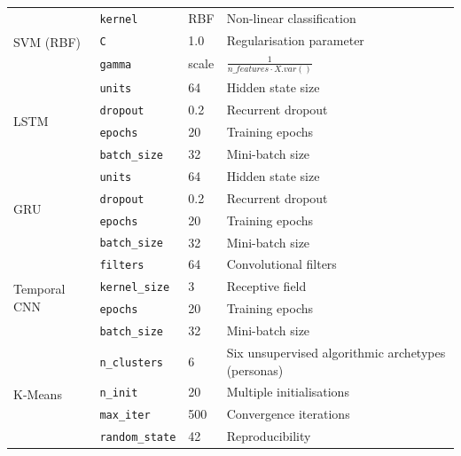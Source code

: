 \begin{table}[!t]
\begin{tabular}{llll}
    \hline
    \multirow{3}{*}{SVM (RBF)}
      & \texttt{kernel}           & RBF            & Non-linear classification \\
      & \texttt{C}                & 1.0            & Regularisation parameter \\
      & \texttt{gamma}            & scale          & $\frac{1}{n\_features \cdot X.var()}$ \\
    \hline
    \multirow{4}{*}{LSTM}
      & \texttt{units}            & 64             & Hidden state size \\
      & \texttt{dropout}          & 0.2            & Recurrent dropout \\
      & \texttt{epochs}           & 20             & Training epochs \\
      & \texttt{batch\_size}      & 32             & Mini-batch size \\
    \hline
    \multirow{4}{*}{GRU}
      & \texttt{units}            & 64             & Hidden state size \\
      & \texttt{dropout}          & 0.2            & Recurrent dropout \\
      & \texttt{epochs}           & 20             & Training epochs \\
      & \texttt{batch\_size}      & 32             & Mini-batch size \\
    \hline
    \multirow{4}{*}{Temporal CNN}
      & \texttt{filters}          & 64             & Convolutional filters \\
      & \texttt{kernel\_size}     & 3              & Receptive field \\
      & \texttt{epochs}           & 20             & Training epochs \\
      & \texttt{batch\_size}      & 32             & Mini-batch size \\
    \hline
    \multirow{4}{*}{K-Means}
      & \texttt{n\_clusters}      & 6              & Six unsupervised algorithmic archetypes (personas) \\
      & \texttt{n\_init}          & 20             & Multiple initialisations \\
      & \texttt{max\_iter}        & 500            & Convergence iterations \\
      & \texttt{random\_state}    & 42             & Reproducibility \\
    \hline
  \end{tabular}
\end{table}



